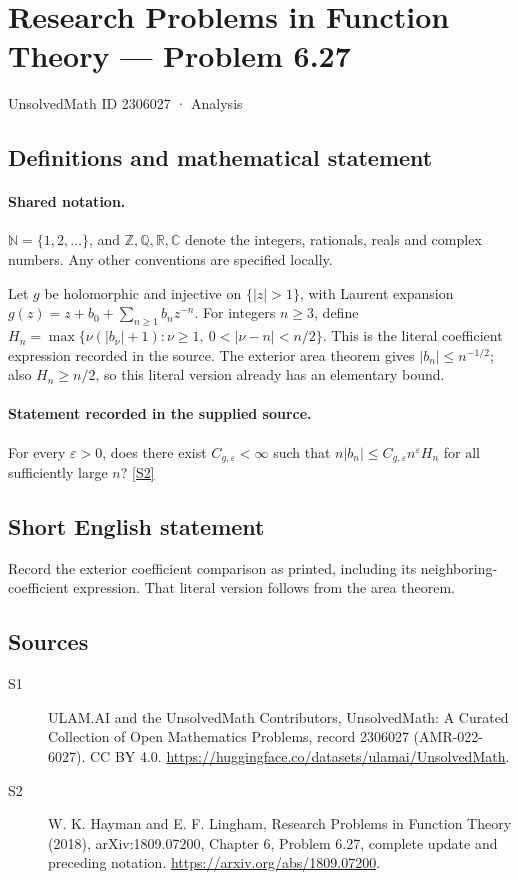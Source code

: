 \documentclass[11pt]{article}
\newcommand{\sref}[2]{\hyperlink{source:#1:#2}{[S#2]}}
\begin{document}
\setcounter{section}{2306026}
\section{Research Problems in Function Theory — Problem 6.27}\label{2306027}
{\small\sffamily UnsolvedMath ID 2306027 · Analysis}
\subsection{Definitions and mathematical statement}

\paragraph{Shared notation.}$\mathbb N=\{1,2,\ldots\}$, and $\mathbb Z,\mathbb Q,\mathbb R,\mathbb C$ denote the integers, rationals, reals and complex numbers. Any other conventions are specified locally.


Let $g$ be holomorphic and injective on $\{|z|>1\}$, with Laurent expansion $g(z)=z+b_0+\sum_{n\ge1}b_nz^{-n}$. For integers $n\ge3$, define $H_n=\max\{\nu(|b_\nu|+1):\nu\ge1,\ 0<|\nu-n|<n/2\}$. This is the literal coefficient expression recorded in the source. The exterior area theorem gives $|b_n|\le n^{-1/2}$; also $H_n\ge n/2$, so this literal version already has an elementary bound.
\paragraph{Statement recorded in the supplied source.}
For every $\varepsilon>0$, does there exist $C_{g,\varepsilon}<\infty$ such that $n|b_n|\le C_{g,\varepsilon}n^\varepsilon H_n$ for all sufficiently large $n$? \sref{2306027}{2}
\subsection{Short English statement}
Record the exterior coefficient comparison as printed, including its neighboring-coefficient expression. That literal version follows from the area theorem.
\subsection{Sources}
\begin{description}
\item[\hypertarget{source:2306027:1}{S1}] ULAM.AI and the UnsolvedMath Contributors, UnsolvedMath: A Curated Collection of Open Mathematics Problems, record 2306027 (AMR-022-6027). CC BY 4.0. \url{https://huggingface.co/datasets/ulamai/UnsolvedMath}.
\item[\hypertarget{source:2306027:2}{S2}] W. K. Hayman and E. F. Lingham, Research Problems in Function Theory (2018), arXiv:1809.07200, Chapter 6, Problem 6.27, complete update and preceding notation. \url{https://arxiv.org/abs/1809.07200}.
\end{description}
\label{end:2306027}
\end{document}
